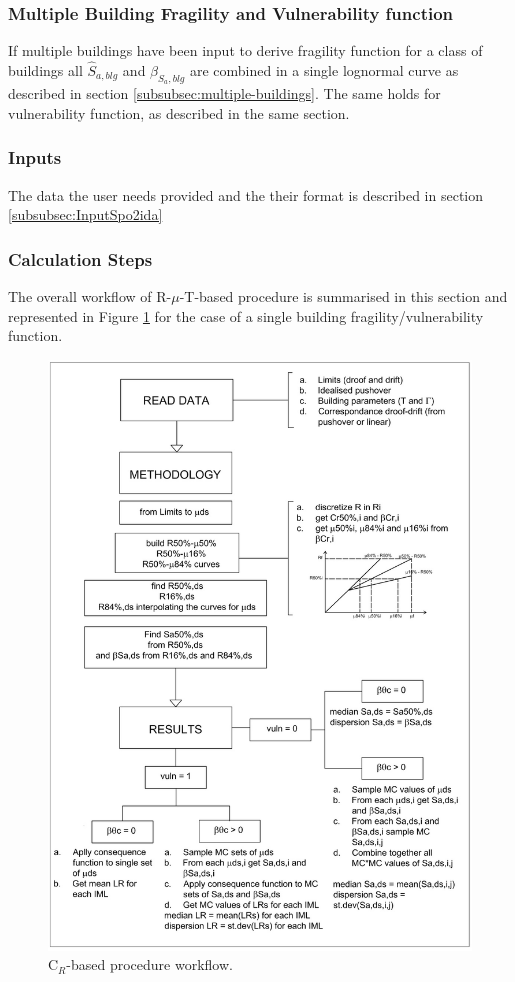 \subsubsection{Multiple Building Fragility and Vulnerability function}
\label{subsubsec:multiple-building-DF}
 If multiple buildings have been input to derive fragility function for a class of buildings all $\hat{S}_{a, blg}$ and $\beta_{S_a, blg}$ are combined in a single lognormal curve as described in section \ref{subsubsec:multiple-buildings}. The same holds for vulnerability function, as described in the same section.

\subsubsection{Inputs}
The data the user needs provided and the their format is described in section \ref{subsubsec:InputSpo2ida}

\subsubsection{Calculation Steps} 
The overall workflow of R-$\mu$-T-based procedure is summarised in this section and represented in Figure \ref{fig:Cr_workflow} for the case of a single building fragility/vulnerability function. 

\begin{figure}[!htbp]
\centering
\includegraphics[width=15cm]{./figures/Cr-WorkFlow.jpg}
\caption{C$_R$-based procedure workflow.}
\label{fig:Cr_workflow}
\end{figure}

